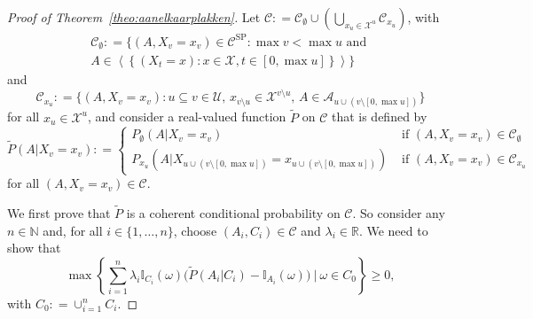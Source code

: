 \documentclass[10pt]{paper}
\theoremstyle{definition}
\newcommand{\nats}{\mathbb{N}}
\newcommand{\reals}{\mathbb{R}}
\newcommand{\states}{\mathcal{X}}
\newcommand{\ind}[1]{\mathbb{I}_{#1}}
\newcommand{\coloneqq}{:\!=}
\begin{document}
\begin{proof}[Proof of Theorem~\ref{theo:aanelkaarplakken}]
Let $\mathcal{C}\coloneqq\mathcal{C}_\emptyset\cup(\bigcup_{x_u\in\states^u}\mathcal{C}_{x_u})$, with
\begin{multline}\label{eq:theo:aanelkaarplakken:firstpartofdomain}
\mathcal{C}_\emptyset\coloneqq
\{(A,X_v=x_v)\in\mathcal{C}^{\mathrm{SP}}\colon \max v<\max u\text{~and~}\\A\in\left\langle
\left\{
(X_t=x)
\colon
x\in\states,t\in[0,\max u]
\right\}
\right\rangle\}
\end{multline}
and
\begin{equation}\label{eq:theo:aanelkaarplakken:secondpartofdomain}
\mathcal{C}_{x_u}\coloneqq\{
(A,X_v=x_v)
\colon
u\subseteq v\in\mathcal{U},\,
x_{v\setminus u}\in\states^{v\setminus u},\,
 A\in\mathcal{A}_{u\cup(v\setminus[0,\max u])}
\}
\end{equation}
for all $x_u\in\states^u$, and consider a real-valued function $\tilde{P}$ on $\mathcal{C}$ that is defined by 
\begin{equation}\label{eq:theo:aanelkaarplakken:defPtilde}
\tilde{P}(A\vert X_v=x_v)
\coloneqq
\begin{cases}
P_\emptyset(A\vert X_v=x_v)&\text{~if $(A,X_v=x_v)\in\mathcal{C}_\emptyset$}\\
P_{x_u}(A\vert 
X_{u\cup(v\setminus[0,\max u])}=x_{u\cup(v\setminus[0,\max u])})&\text{~if $(A,X_v=x_v)\in\mathcal{C}_{x_u}$}
\end{cases}
\end{equation}
for all $(A,X_v=x_v)\in\mathcal{C}$.

We first prove that $\tilde{P}$ is a coherent conditional probability on $\mathcal{C}$. So consider any $n\in\nats$ and, for all $i\in\{1,\dots,n\}$, choose $(A_i,C_i)\in\mathcal{C}$ and $\lambda_i\in\reals$. We need to show that
\begin{equation}\label{eq:theo:aanelkaarplakken:coh}
\max\left\{\sum_{i=1}^n\lambda_i\ind{C_i}(\omega)\bigl(\tilde{P}(A_i\vert C_i)-\ind{A_i}(\omega)\bigr)~\Bigg\vert~\omega\in C_0\right\}\geq0,
\end{equation}
with $C_0\coloneqq\cup_{i=1}^nC_i$.


\end{proof}
\end{document}
